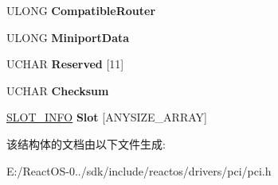 \begin{DoxyCompactItemize}
U\+L\+O\+NG {\bfseries Compatible\+Router}
\item 
\mbox{\label{struct___p_c_i___i_r_q___r_o_u_t_i_n_g___t_a_b_l_e_aa5a228c85e028d43037e45d751279b4d}} 
U\+L\+O\+NG {\bfseries Miniport\+Data}
\item 
\mbox{\label{struct___p_c_i___i_r_q___r_o_u_t_i_n_g___t_a_b_l_e_a41c5a43878d06bde5fef6cf897cf55ef}} 
U\+C\+H\+AR {\bfseries Reserved} \mbox{[}11\mbox{]}
\item 
\mbox{\label{struct___p_c_i___i_r_q___r_o_u_t_i_n_g___t_a_b_l_e_a0ac27b4d136c5cdd300953f3f677bb7f}} 
U\+C\+H\+AR {\bfseries Checksum}
\item 
\mbox{\label{struct___p_c_i___i_r_q___r_o_u_t_i_n_g___t_a_b_l_e_a38d6097e8fc75f4fb640e9c27555817b}} 
\hyperlink{struct___s_l_o_t___i_n_f_o}{S\+L\+O\+T\+\_\+\+I\+N\+FO} {\bfseries Slot} \mbox{[}A\+N\+Y\+S\+I\+Z\+E\+\_\+\+A\+R\+R\+AY\mbox{]}
\end{DoxyCompactItemize}


该结构体的文档由以下文件生成\+:\begin{DoxyCompactItemize}
\item 
E\+:/\+React\+O\+S-\/0../sdk/include/reactos/drivers/pci/pci.\+h\end{DoxyCompactItemize}
